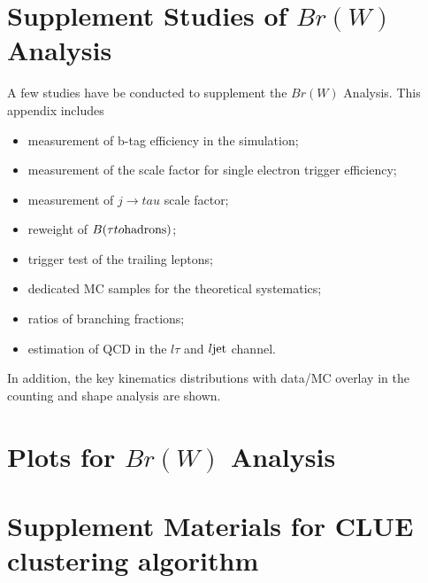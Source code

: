 \chapter{Supplement Studies of $Br(W)$ Analysis}

A few studies have be conducted to supplement the $Br(W)$ Analysis.
This appendix includes 
\begin{itemize}
    \item measurement of b-tag efficiency in the simulation;
    \item measurement of the scale factor for single electron trigger efficiency;
    \item measurement of $j \to tau$ scale factor;
    \item reweight of $B(\tau \to  \rm{hadrons})$;
    \item trigger test of the trailing leptons;
    \item dedicated MC samples for the \ttbar theoretical systematics;
    \item ratios of branching fractions;
    \item estimation of QCD in the $l\tau$ and $l\rm{jet}$ channel. 
\end{itemize}

\noindent In addition, the key kinematics distributions with 
data/MC overlay in the counting and shape analysis are shown.














\chapter{Plots for $Br(W)$ Analysis}





\chapter{Supplement Materials for CLUE clustering algorithm}

